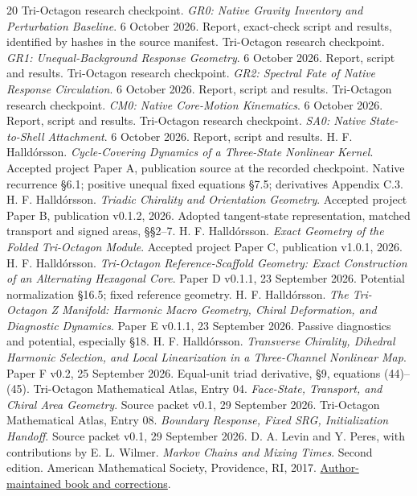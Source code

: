 \begin{thebibliography}{20}
 Tri-Octagon research checkpoint. \emph{GR0: Native Gravity Inventory and Perturbation Baseline}. 6 October 2026. Report, exact-check script and results, identified by hashes in the source manifest.
 Tri-Octagon research checkpoint. \emph{GR1: Unequal-Background Response Geometry}. 6 October 2026. Report, script and results.
 Tri-Octagon research checkpoint. \emph{GR2: Spectral Fate of Native Response Circulation}. 6 October 2026. Report, script and results.
 Tri-Octagon research checkpoint. \emph{CM0: Native Core-Motion Kinematics}. 6 October 2026. Report, script and results.
 Tri-Octagon research checkpoint. \emph{SA0: Native State-to-Shell Attachment}. 6 October 2026. Report, script and results.
 H. F. Halld\'orsson. \emph{Cycle-Covering Dynamics of a Three-State Nonlinear Kernel}. Accepted project Paper A, publication source at the recorded checkpoint. Native recurrence \S6.1; positive unequal fixed equations \S7.5; derivatives Appendix C.3.
 H. F. Halld\'orsson. \emph{Triadic Chirality and Orientation Geometry}. Accepted project Paper B, publication v0.1.2, 2026. Adopted tangent-state representation, matched transport and signed areas, \S\S2--7.
 H. F. Halld\'orsson. \emph{Exact Geometry of the Folded Tri-Octagon Module}. Accepted project Paper C, publication v1.0.1, 2026.
 H. F. Halld\'orsson. \emph{Tri-Octagon Reference-Scaffold Geometry: Exact Construction of an Alternating Hexagonal Core}. Paper D v0.1.1, 23 September 2026. Potential normalization \S16.5; fixed reference geometry.
 H. F. Halld\'orsson. \emph{The Tri-Octagon Z Manifold: Harmonic Macro Geometry, Chiral Deformation, and Diagnostic Dynamics}. Paper E v0.1.1, 23 September 2026. Passive diagnostics and potential, especially \S18.
 H. F. Halld\'orsson. \emph{Transverse Chirality, Dihedral Harmonic Selection, and Local Linearization in a Three-Channel Nonlinear Map}. Paper F v0.2, 25 September 2026. Equal-unit triad derivative, \S9, equations (44)--(45).
 Tri-Octagon Mathematical Atlas, Entry 04. \emph{Face-State, Transport, and Chiral Area Geometry}. Source packet v0.1, 29 September 2026.
 Tri-Octagon Mathematical Atlas, Entry 08. \emph{Boundary Response, Fixed SRG, Initialization Handoff}. Source packet v0.1, 29 September 2026.
 D. A. Levin and Y. Peres, with contributions by E. L. Wilmer. \emph{Markov Chains and Mixing Times}. Second edition. American Mathematical Society, Providence, RI, 2017. \href{https://pages.uoregon.edu/dlevin/MARKOV/}{Author-maintained book and corrections}.

\end{thebibliography}

